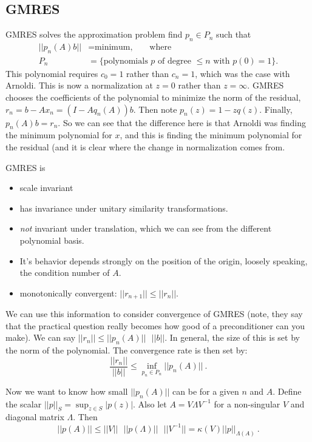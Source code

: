 \documentclass[12pt,twoside]{book}
\begin{document}
\subsection{GMRES}
\noindent GMRES solves the approximation problem find $p_{n} \in P_{n}$ such that 
%
\begin{align}
  ||p_{n}(A)b|| &= \text{minimum,} \qquad \text{where} \\
  P_{n} &= \{ \text{polynomials } p \text{ of degree } \le n \text{ with } p(0)=1\}.
\end{align}
%
This polynomial requires $c_{0} = 1$ rather than $c_{n} = 1$, which was the case with Arnoldi. This is now a normalization at $z=0$ rather than $z=\infty$. GMRES chooses the coefficients of the polynomial to minimize the norm of the residual, $r_{n} = b - Ax_{n} = (I - Aq_{n}(A))b$. Then note $p_{n}(z) = 1 - zq(z)$. Finally, $p_{n}(A)b = r_{n}$. So we can see that the difference here is that Arnoldi was finding the minimum polynomial for $x$, and this is finding the minimum polynomial for the residual (and it is clear where the change in normalization comes from.

GMRES is 
\begin{itemize}
 \item scale invariant 
 \item has invariance under unitary similarity transformations.
  \item \emph{not} invariant under translation, which we can see from the different polynomial basis.
  \item It's behavior depends strongly on the position of the origin, loosely speaking, the condition number of $A$.
  \item monotonically convergent: $||r_{n+1}|| \le ||r_{n}||$.
\end{itemize}

We can use this information to consider convergence of GMRES (note, they say that the practical question really becomes how good of a preconditioner can you make). We can say $||r_{n}|| \le ||p_{n}(A)||\text{ }||b||$. In general, the size of this is set by the norm of the polynomial. The convergence rate is then set by:
%
\begin{equation}
  \frac{||r_{n}||}{||b||} \le \inf_{p_{n}\in P_{n}} ||p_{n}(A)|| \:.
\end{equation}

Now we want to know how small $||p_{n}(A)||$ can be for a given $n$ and $A$. Define the scalar $||p||_{S} = \sup_{z\in S} |p(z)|$. Also let $A=V \Lambda V^{-1}$ for a non-singular $V$ and diagonal matrix $\Lambda$. Then
%
\begin{equation}
  ||p(A)|| \le ||V|| \text{ } ||p(\Lambda)|| \text{ } ||V^{-1}|| = \kappa(V) ||p||_{\Lambda(A)} \:.
\end{equation}
\end{document}

